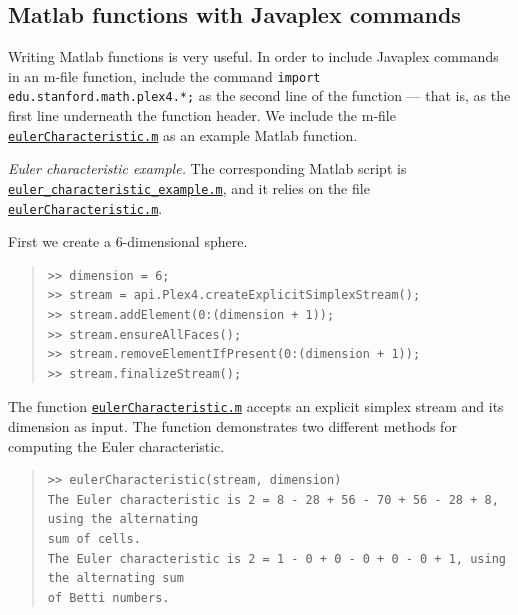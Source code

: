 \documentclass[amscd, amssymb, verbatim]{amsart}[12pt]
\theoremstyle{remark}
\theoremstyle{remark}
\theoremstyle{remark}
\begin{document}
\subsection{Matlab functions with Javaplex commands}\label{SS:matlabFunctions}
Writing Matlab functions is very useful. In order to include Javaplex commands in an m-file function, include the command \texttt{import edu.stanford.math.plex4.*;} as the second line of the function ---  that is, as the first line underneath the function header. We include the m-file \href{https://github.com/appliedtopology/javaplex/tree/master/src/matlab/for_distribution/tutorial_examples/eulerCharacteristic.m}{\texttt{eulerCharacteristic.m}} as an example Matlab function.

{\em Euler characteristic example.}
The corresponding Matlab script is \href{https://github.com/appliedtopology/javaplex/tree/master/src/matlab/for_distribution/tutorial_examples/euler_characteristic_example.m}{\texttt{euler\_characteristic\_example.m}}, and it relies on the file \href{https://github.com/appliedtopology/javaplex/tree/master/src/matlab/for_distribution/tutorial_examples/eulerCharacteristic.m}{\texttt{eulerCharacteristic.m}}. 

First we create a 6-dimensional sphere. 

\begin{quote} \begin{verbatim}
>> dimension = 6;
>> stream = api.Plex4.createExplicitSimplexStream();
>> stream.addElement(0:(dimension + 1));
>> stream.ensureAllFaces();
>> stream.removeElementIfPresent(0:(dimension + 1));
>> stream.finalizeStream();
\end{verbatim} \end{quote}

The function \href{https://github.com/appliedtopology/javaplex/tree/master/src/matlab/for_distribution/tutorial_examples/eulerCharacteristic.m}{\texttt{eulerCharacteristic.m}} accepts an explicit simplex stream and its dimension as input. The function demonstrates two different methods for computing the Euler characteristic.

\begin{quote} \begin{verbatim}
>> eulerCharacteristic(stream, dimension)
The Euler characteristic is 2 = 8 - 28 + 56 - 70 + 56 - 28 + 8, using the alternating 
sum of cells.
The Euler characteristic is 2 = 1 - 0 + 0 - 0 + 0 - 0 + 1, using the alternating sum 
of Betti numbers.
\end{verbatim} \end{quote}
\end{document}
